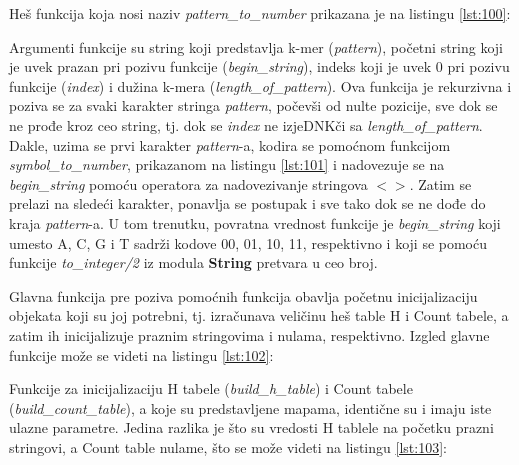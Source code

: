 \documentclass[12pt,oneside]{memoir}
\begin{document}
Heš funkcija koja nosi naziv \textit{pattern\_to\_number} prikazana je na listingu \ref{lst:100}:



Argumenti funkcije su string koji predstavlja k-mer (\textit{pattern}), početni string koji je uvek prazan pri pozivu funkcije (\textit{begin\_string}), indeks  koji je uvek 0 pri pozivu funkcije (\textit{index}) i dužina k-mera (\textit{length\_of\_pattern}). Ova funkcija je rekurzivna i poziva se za svaki karakter stringa \textit{pattern}, počevši od nulte pozicije, sve dok se ne prođe kroz ceo string, tj. dok se \textit{index} ne izjeDNKči sa \textit{length\_of\_pattern}. Dakle, uzima se prvi karakter \textit{pattern}-a, kodira se pomoćnom funkcijom \textit{symbol\_to\_number}, prikazanom na listingu \ref{lst:101} i nadovezuje se na \textit{begin\_string} pomoću operatora za nadovezivanje stringova $<>$. Zatim se prelazi na sledeći karakter, ponavlja se postupak i sve tako dok se ne dođe do kraja \textit{pattern}-a. U tom trenutku, povratna vrednost funkcije je \textit{begin\_string} koji umesto A, C, G i T sadrži kodove 00, 01, 10, 11, respektivno i koji se pomoću funkcije \textit{to\_integer/2} iz modula \textbf{String} pretvara u ceo broj.



Glavna funkcija pre poziva pomoćnih funkcija obavlja početnu inicijalizaciju objekata koji su joj potrebni, tj. izračunava veličinu heš table H i Count tabele, a zatim ih inicijalizuje praznim stringovima i nulama, respektivno. Izgled glavne funkcije može se videti na listingu \ref{lst:102}:

\newpage



Funkcije za inicijalizaciju H tabele (\textit{build\_h\_table}) i Count tabele (\textit{build\_count\_table}), a koje su predstavljene mapama, identične su i imaju iste ulazne parametre. Jedina razlika je što su vredosti H tablele na početku prazni stringovi, a Count table nulame, što se može videti na listingu \ref{lst:103}:


\end{document}
